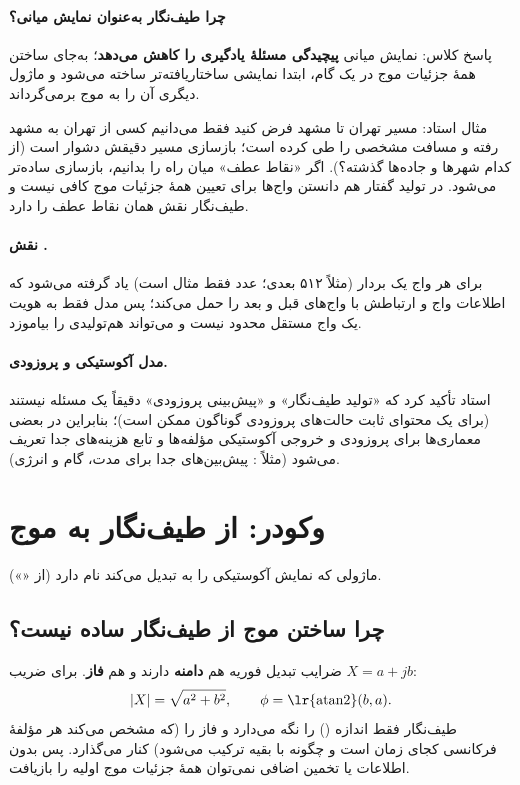 \paragraph{چرا طیف‌نگار به‌عنوان نمایش میانی؟} پاسخ کلاس: نمایش میانی \textbf{پیچیدگی مسئلهٔ یادگیری را کاهش می‌دهد}؛ به‌جای ساختن همهٔ جزئیات موج در یک گام، ابتدا نمایشی ساختاریافته‌تر ساخته می‌شود و ماژول دیگری آن را به موج برمی‌گرداند.

\begin{exambox}{مثال استاد: مسیر تهران تا مشهد}
فرض کنید فقط می‌دانیم کسی از تهران به مشهد رفته و مسافت مشخصی را طی کرده است؛ بازسازی مسیر دقیقش دشوار است (از کدام شهرها و جاده‌ها گذشته؟). اگر «نقاط عطف» میان راه را بدانیم، بازسازی ساده‌تر می‌شود. در تولید گفتار هم دانستن واج‌ها برای تعیین همهٔ جزئیات موج کافی نیست و طیف‌نگار نقش همان نقاط عطف را دارد.
\end{exambox}

\paragraph{نقش .} برای هر واج یک بردار  (مثلاً ۵۱۲ بعدی؛ عدد فقط مثال است) یاد گرفته می‌شود که اطلاعات واج و ارتباطش با واج‌های قبل و بعد را حمل می‌کند؛ پس مدل فقط به هویت یک واج مستقل محدود نیست و می‌تواند هم‌تولیدی را بیاموزد.

\paragraph{مدل آکوستیکی و پروزودی.} استاد تأکید کرد که «تولید طیف‌نگار» و «پیش‌بینی پروزودی» دقیقاً یک مسئله نیستند (برای یک محتوای ثابت حالت‌های پروزودی گوناگون ممکن است)؛ بنابراین در بعضی معماری‌ها برای پروزودی و خروجی آکوستیکی مؤلفه‌ها و تابع هزینه‌های جدا تعریف می‌شود (مثلاً : پیش‌بین‌های جدا برای مدت، گام و انرژی).

\section{وکودر: از طیف‌نگار به موج}

ماژولی که نمایش آکوستیکی را به  تبدیل می‌کند  نام دارد (از «»).

\subsection{چرا ساختن موج از طیف‌نگار ساده نیست؟}
ضرایب تبدیل فوریه هم \textbf{دامنه} دارند و هم \textbf{فاز}. برای ضریب $X = a + jb$:
\[
|X| = \sqrt{a^{2}+b^{2}}, \qquad \phi = \text{\lr{atan2}}(b,a).
\]
طیف‌نگار فقط اندازه () را نگه می‌دارد و فاز را (که مشخص می‌کند هر مؤلفهٔ فرکانسی کجای زمان است و چگونه با بقیه ترکیب می‌شود) کنار می‌گذارد. پس بدون اطلاعات یا تخمین اضافی نمی‌توان همهٔ جزئیات موج اولیه را بازیافت.

